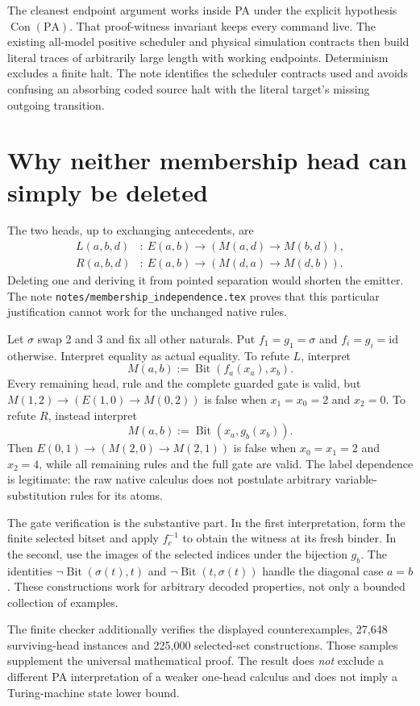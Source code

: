 \documentclass[11pt,letterpaper]{article}
\newcommand{\PA}{\mathrm{PA}}
\newcommand{\Con}{\operatorname{Con}}
\newcommand{\Bit}{\operatorname{Bit}}
\newcommand{\file}[1]{\texttt{\nolinkurl{#1}}}
\begin{document}
The cleanest endpoint argument works inside PA under the explicit
hypothesis $\Con(\PA)$. That proof-witness invariant keeps every command
live. The existing all-model positive scheduler and physical simulation
contracts then build literal traces of arbitrarily large length with
working endpoints. Determinism excludes a finite halt. The note identifies
the scheduler contracts used and avoids confusing an absorbing coded
source halt with the literal target's missing outgoing transition.

\section{Why neither membership head can simply be deleted}

The two heads, up to exchanging antecedents, are
\begin{align*}
 L(a,b,d)&:\ E(a,b)\to(M(a,d)\to M(b,d)),\\
 R(a,b,d)&:\ E(a,b)\to(M(d,a)\to M(d,b)).
\end{align*}
Deleting one and deriving it from pointed separation would shorten the
emitter. The note \file{notes/membership_independence.tex} proves that this
particular justification cannot work for the unchanged native rules.

Let $\sigma$ swap 2 and 3 and fix all other naturals. Put $f_1=g_1=\sigma$
and $f_i=g_i=\mathrm{id}$ otherwise. Interpret equality as actual equality.
To refute $L$, interpret
\[
           M(a,b):=\Bit(f_a(x_a),x_b).
\]
Every remaining head, rule and the complete guarded gate is valid, but
$M(1,2)\to(E(1,0)\to M(0,2))$ is false when
$x_1=x_0=2$ and $x_2=0$. To refute $R$, instead interpret
\[
           M(a,b):=\Bit(x_a,g_b(x_b)).
\]
Then $E(0,1)\to(M(2,0)\to M(2,1))$ is false when
$x_0=x_1=2$ and $x_2=4$, while all remaining rules and the full gate
are valid. The label dependence is legitimate: the raw native calculus
does not postulate arbitrary variable-substitution rules for its atoms.

The gate verification is the substantive part. In the first interpretation,
form the finite selected bitset and apply $f_c^{-1}$ to obtain the witness
at its fresh binder. In the second, use the images of the selected indices
under the bijection $g_b$. The identities
$\neg\Bit(\sigma(t),t)$ and $\neg\Bit(t,\sigma(t))$ handle the diagonal
case $a=b$. These constructions work for arbitrary decoded properties,
not only a bounded collection of examples.

The finite checker additionally verifies the displayed counterexamples,
27,648 surviving-head instances and 225,000 selected-set constructions.
Those samples supplement the universal mathematical proof. The result
does \emph{not} exclude a different PA interpretation of a weaker
one-head calculus and does not imply a Turing-machine state lower bound.
\end{document}
